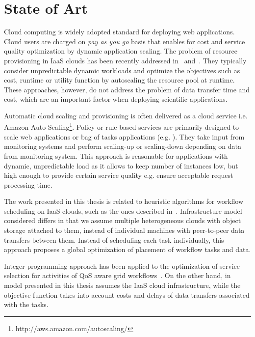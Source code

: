 \chapter{State of Art} \label{chap:state-of-art}  
 
Cloud computing is widely adopted standard for deploying web applications. Cloud users are charged on \emph{pay as you go} basis that enables for cost and service quality optimization by dynamic application scaling. The problem of resource provisioning in IaaS clouds has been recently addressed in~\cite{Chen2011, Kim2011} and~\cite{SqueezingOut}. They typically consider unpredictable dynamic workloads and optimize the objectives such as cost, runtime or utility function by autoscaling the resource pool at runtime. These approaches, however, do not address the problem of data transfer time and cost, which are an important factor when deploying scientific applications.

Automatic cloud scaling and provisioning is often delivered as a cloud service i.e. Amazon Auto Scaling\footnote{http://aws.amazon.com/autoscaling/}. Policy or rule based services are primarily designed to scale web applications\cite{SqueezingOut} or bag of tasks applications (e.g. \cite{ElasticSite, Kim2011}). They take input from monitoring systems and perform scaling-up or scaling-down depending on data from monitoring system. This approach is reasonable for applications with dynamic, unpredictable load as it allows to keep number of instances low, but high enough to provide certain service quality e.g. ensure acceptable request processing time.

The work presented in this thesis is related to heuristic algorithms for workflow scheduling on IaaS clouds, such as the ones described in~\cite{Abrishami2013158,Mao11,BarrionuevoFP12,BittencourtM11}. Infrastructure model considered differs in that we assume multiple heterogeneous clouds with object storage attached to them, instead of individual machines with peer-to-peer data transfers between them. Instead of scheduling each task individually, this approach proposes a global optimization of placement of workflow tasks and data.

Integer programming approach has been applied to the optimization of service selection for activities of QoS aware grid workflows~\cite{Brandic08}. On the other hand, in model presented in this thesis assumes the IaaS cloud infrastructure, while the objective function takes into account costs and delays of data transfers associated with the tasks.

